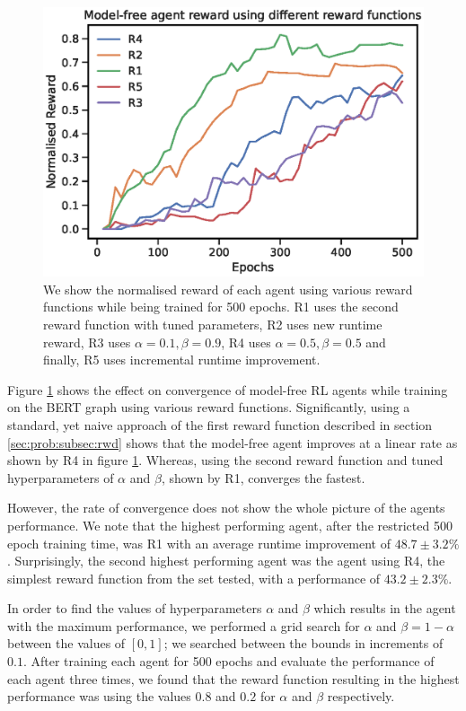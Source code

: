 \begin{figure}[h]
  \centering
  \includegraphics[width=1\columnwidth]{sections/5evaluation/images/mf_reward_func.eps}
  \caption[Agent reward using various reward functions]{We show the normalised reward of each agent using various reward functions while being trained for 500 epochs. R1 uses the second reward function with tuned parameters, R2 uses new runtime reward, R3 uses $\alpha=0.1, \beta=0.9$, R4 uses $\alpha=0.5, \beta=0.5$ and finally, R5 uses incremental runtime improvement.}
  \label{fig:eval:mf-reward-funcs}
\end{figure}

Figure \ref{fig:eval:mf-reward-funcs} shows the effect on convergence of model-free RL agents while training on the BERT graph using various reward functions. Significantly, using a standard, yet naive approach of the first reward function described in section \ref{sec:prob:subsec:rwd} shows that the model-free agent improves at a linear rate as shown by R4 in figure \ref{fig:eval:mf-reward-funcs}. Whereas, using the second reward function and tuned hyperparameters of $\alpha$ and $\beta$, shown by R1, converges the fastest.

However, the rate of convergence does not show the whole picture of the agents performance. We note that the highest performing agent, after the restricted 500 epoch training time, was R1 with an average runtime improvement of $48.7 \pm 3.2\%$. Surprisingly, the second highest performing agent was the agent using R4, the simplest reward function from the set tested, with a performance of $43.2 \pm 2.3\%$.

In order to find the values of hyperparameters $\alpha$ and $\beta$ which results in the agent with the maximum performance, we performed a grid search for $\alpha$ and $\beta = 1 - \alpha$ between the values of $[0, 1]$; we searched between the bounds in increments of $0.1$. After training each agent for 500 epochs and evaluate the performance of each agent three times, we found that the reward function resulting in the highest performance was using the values $0.8$ and $0.2$ for $\alpha$ and $\beta$ respectively.

